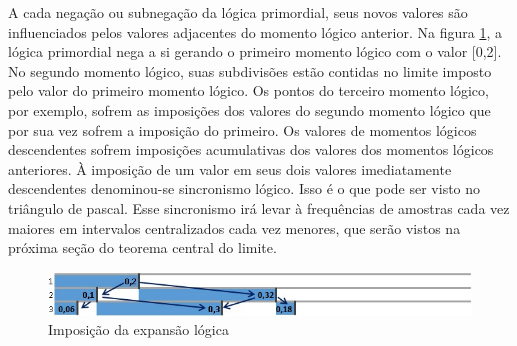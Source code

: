 A cada negação ou subnegação da lógica primordial, seus novos valores são influenciados pelos valores adjacentes do momento lógico anterior. Na figura \ref{fig:imposition_of_binomial_expansion}, a lógica primordial nega a si gerando o primeiro momento lógico com o valor [0,2].  No segundo momento lógico, suas subdivisões estão contidas no limite imposto pelo valor do primeiro momento lógico. Os pontos do terceiro momento lógico, por exemplo, sofrem as imposições dos valores do segundo momento lógico que por sua vez sofrem a imposição do primeiro. Os valores de momentos lógicos descendentes sofrem imposições acumulativas dos valores dos momentos lógicos anteriores. À imposição de um valor em seus dois valores imediatamente descendentes denominou-se sincronismo lógico. Isso é o que pode ser visto no triângulo de pascal. Esse sincronismo irá levar à frequências de amostras cada vez maiores em intervalos centralizados cada vez menores, que serão vistos na próxima seção do teorema central do limite.
	\begin{figure}[H]
	\caption{Imposição da expansão lógica}
	\label{fig:imposition_of_binomial_expansion}
	\centering
	\includegraphics[scale=.85]{sections/images/imposition_of_binomial_expansion.jpg}
	\end{figure}

